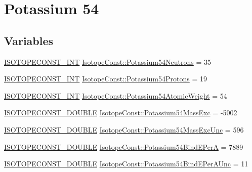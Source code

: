 \hypertarget{group___isotope_const-_potassium-_k54}{}\section{Potassium 54}
\label{group___isotope_const-_potassium-_k54}
\subsection*{Variables}
\begin{DoxyCompactItemize}
\item 
\mbox{\hyperlink{group___isotope_const-_macros_ga5f18360b3e99483a35c32d789e62621c}{I\+S\+O\+T\+O\+P\+E\+C\+O\+N\+S\+T\+\_\+\+I\+NT}} \mbox{\hyperlink{group___isotope_const-_potassium-_k54_ga024a73d24faa05c800a55745890954b1}{Isotope\+Const\+::\+Potassium54\+Neutrons}} = 35
\item 
\mbox{\hyperlink{group___isotope_const-_macros_ga5f18360b3e99483a35c32d789e62621c}{I\+S\+O\+T\+O\+P\+E\+C\+O\+N\+S\+T\+\_\+\+I\+NT}} \mbox{\hyperlink{group___isotope_const-_potassium-_k54_gab3f05b939e2a27fd9ad985f72a1c0258}{Isotope\+Const\+::\+Potassium54\+Protons}} = 19
\item 
\mbox{\hyperlink{group___isotope_const-_macros_ga5f18360b3e99483a35c32d789e62621c}{I\+S\+O\+T\+O\+P\+E\+C\+O\+N\+S\+T\+\_\+\+I\+NT}} \mbox{\hyperlink{group___isotope_const-_potassium-_k54_gabf514de64e4896fe0640e4376d3113cf}{Isotope\+Const\+::\+Potassium54\+Atomic\+Weight}} = 54
\item 
\mbox{\hyperlink{group___isotope_const-_macros_ga8f45a7272ce02c0b4c65c44636ed719a}{I\+S\+O\+T\+O\+P\+E\+C\+O\+N\+S\+T\+\_\+\+D\+O\+U\+B\+LE}} \mbox{\hyperlink{group___isotope_const-_potassium-_k54_gad99aa094009ce2e40b25dd9f276e2726}{Isotope\+Const\+::\+Potassium54\+Mass\+Exc}} = -\/5002
\item 
\mbox{\hyperlink{group___isotope_const-_macros_ga8f45a7272ce02c0b4c65c44636ed719a}{I\+S\+O\+T\+O\+P\+E\+C\+O\+N\+S\+T\+\_\+\+D\+O\+U\+B\+LE}} \mbox{\hyperlink{group___isotope_const-_potassium-_k54_gaad7edb0ffb3c2cddc9e64f4e6cc30531}{Isotope\+Const\+::\+Potassium54\+Mass\+Exc\+Unc}} = 596
\item 
\mbox{\hyperlink{group___isotope_const-_macros_ga8f45a7272ce02c0b4c65c44636ed719a}{I\+S\+O\+T\+O\+P\+E\+C\+O\+N\+S\+T\+\_\+\+D\+O\+U\+B\+LE}} \mbox{\hyperlink{group___isotope_const-_potassium-_k54_ga237e481cd27bdddff5c8c3ed5baf7ddb}{Isotope\+Const\+::\+Potassium54\+Bind\+E\+PerA}} = 7889
\item 
\mbox{\hyperlink{group___isotope_const-_macros_ga8f45a7272ce02c0b4c65c44636ed719a}{I\+S\+O\+T\+O\+P\+E\+C\+O\+N\+S\+T\+\_\+\+D\+O\+U\+B\+LE}} \mbox{\hyperlink{group___isotope_const-_potassium-_k54_ga21b2c4fd7fca8ad5212536413dbac67d}{Isotope\+Const\+::\+Potassium54\+Bind\+E\+Per\+A\+Unc}} = 11

\end{DoxyCompactItemize}
